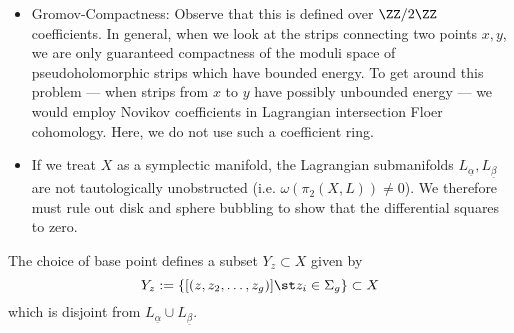 \begin{itemize}
    \item Gromov-Compactness: Observe that this is defined over $\ZZ/2\ZZ$ coefficients. In general, when we look at the strips connecting two points $x, y$, we are only guaranteed compactness of the moduli space of pseudoholomorphic strips which have bounded energy. To get around this problem --- when strips from $x$ to $y$ have possibly unbounded energy --- we would employ Novikov coefficients in Lagrangian intersection Floer cohomology. Here, we do not use such a coefficient ring. 
    \item  If we treat $X$ as a symplectic manifold, the Lagrangian submanifolds $L_{\underline \alpha}, L_{\underline \beta}$ are not tautologically unobstructed (i.e. $\omega(\pi_2(X, L))\neq 0$). We therefore must rule out disk and sphere bubbling to show that the differential squares to zero.
\end{itemize}

The choice of base point defines a subset $Y_z\subset X$ given by  
\[ Y_z:=\{[(z, z_2, \ldots, z_g)] \st z_i\in \Sigma_g\} \subset X\]
which is disjoint from $L_{\underline \alpha}\cup L_{\underline \beta}$. 

